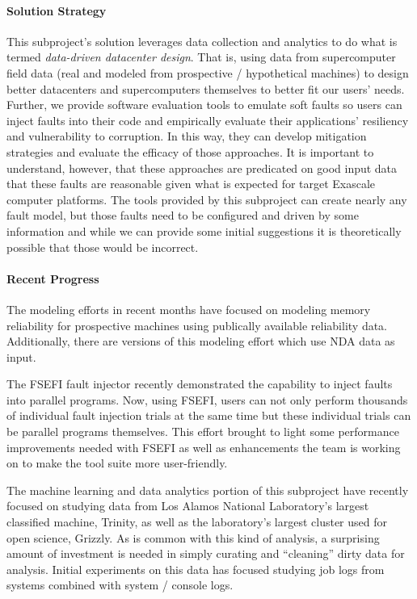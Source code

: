 \paragraph{Solution Strategy}
This subproject's solution leverages data collection and analytics to do what
is termed \emph{data-driven datacenter design}.  That is, using data from
supercomputer field data (real and modeled from prospective / hypothetical
machines) to design better datacenters and supercomputers themselves to better
fit our users' needs.  Further, we provide software evaluation tools to emulate
soft faults so users can inject faults into their code and empirically evaluate
their applications' resiliency and vulnerability to corruption.  In this way,
they can develop mitigation strategies and evaluate the efficacy of those
approaches.  It is important to understand, however, that these approaches are
predicated on good input data that these faults are reasonable given what is
expected for target Exascale computer platforms.  The tools provided by this
subproject can create nearly any fault model, but those faults need to be
configured and driven by some information and while we can provide some initial
suggestions it is theoretically possible that those would be incorrect.

\paragraph{Recent Progress}
The modeling efforts in recent months have focused on modeling memory
reliability for prospective machines using publically available reliability
data.  Additionally, there are versions of this modeling effort which use NDA
data as input.

The FSEFI\cite{pfsefigithub,6877352} fault injector recently demonstrated the
capability to inject faults into parallel programs.  Now, using FSEFI, users
can not only perform thousands of individual fault injection trials at the same
time but these individual trials can be parallel programs themselves.  This
effort brought to light some performance improvements needed with FSEFI as well
as enhancements the team is working on to make the tool suite more
user-friendly.

The machine learning and data analytics portion of this subproject have
recently focused on studying data from Los Alamos National Laboratory's largest
classified machine, Trinity, as well as the laboratory's largest cluster used
for open science, Grizzly.  As is common with this kind of analysis, a
surprising amount of investment is needed in simply curating and ``cleaning''
dirty data for analysis.  Initial experiments on this data has focused
studying job logs from systems combined with system / console logs.


